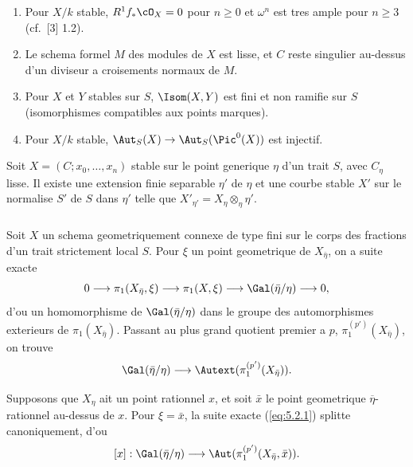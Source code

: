 \begin{enumerate}[label=(\arabic*)]
\item Pour $X/k$ stable, $R^1 f_* \cO_X = 0$ pour $n \geqslant 0$ et $\omega^n$ est tres ample pour $n \geqslant 3$ (cf.~[3] 1.2).
\item Le schema formel $M$ des modules de $X$ est lisse, et $C$ reste singulier au-dessus d'un diviseur a croisements normaux de $M$.
\item Pour $X$ et $Y$ stables sur $S$, $\Isom(X,Y)$ est fini et non ramifie sur $S$ (isomorphismes compatibles aux points marques).
\item Pour $X/k$ stable, $\Aut_S(X) \to \Aut_S(\Pic^0(X))$ est injectif.
\end{enumerate}

\begin{proposition}
\label{prop:5.1.1}
Soit $X = (C; x_0, \ldots, x_n)$ stable sur le point generique $\eta$ d'un trait $S$, avec $C_\eta$ lisse. Il existe une extension finie separable $\eta'$ de $\eta$ et une courbe stable $X'$ sur le normalise $S'$ de $S$ dans $\eta'$ telle que $X'_{\eta'} = X_\eta \otimes_\eta \eta'$.
\end{proposition}

\subsubsection{}
\label{subsubsec:5.2}
Soit $X$ un schema geometriquement connexe de type fini sur le corps des fractions d'un trait strictement local $S$. Pour $\xi$ un point geometrique de $X_{\bar{\eta}}$, on a suite exacte
\begin{equation}
\label{eq:5.2.1}
0 \longrightarrow \pi_1(X_{\bar{\eta}}, \xi) \longrightarrow \pi_1(X, \xi) \longrightarrow \Gal(\bar{\eta}/\eta) \longrightarrow 0 ,
\end{equation}
d'ou un homomorphisme de $\Gal(\bar{\eta}/\eta)$ dans le groupe des automorphismes exterieurs de $\pi_1(X_{\bar{\eta}})$. Passant au plus grand quotient premier a $p$, $\pi_1^{(p')}(X_{\bar{\eta}})$, on trouve
\begin{equation}
\label{eq:5.2.2}
\Gal(\bar{\eta}/\eta) \longrightarrow \Autext(\pi_1^{(p')}(X_{\bar{\eta}})) .
\end{equation}

Supposons que $X_\eta$ ait un point rationnel $x$, et soit $\bar{x}$ le point geometrique $\overline{\eta}$-rationnel au-dessus de $x$. Pour $\xi = \bar{x}$, la suite exacte (\ref{eq:5.2.1}) splitte canoniquement, d'ou
\begin{equation}
\label{eq:5.2.3}
[x] : \Gal(\bar{\eta}/\eta) \longrightarrow \Aut(\pi_1^{(p')}(X_{\bar{\eta}}, \bar{x})) .
\end{equation}

